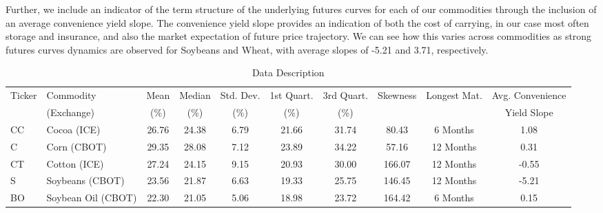\documentclass[12pt,a4paper]{article}
\providecommand{\tabularnewline}{\\}
\begin{document}
Further, we include an indicator of the term structure of the underlying futures curves for each of our commodities through the inclusion of an average convenience yield slope. The convenience yield slope provides an indication of both the cost of carrying, in our case most often storage and insurance, and also the market expectation of future price trajectory. We can see how this varies across commodities as strong futures curves dynamics are observed for Soybeans and Wheat, with average slopes of -5.21 and 3.71, respectively.

\begin{table}[!htbp]
\caption{Data Description}\label{tab:Data-Description}
\centering
\tabcolsep 0.025in
\begin{tabular}{@{}llcccccccc@{}}
\toprule
{\footnotesize{}Ticker} & {\footnotesize{}Commodity} & {\footnotesize{}Mean} & {\footnotesize{}Median} & {\footnotesize{}Std. Dev.} & {\footnotesize{}1st Quart.} & {\footnotesize{}3rd Quart.} & {\footnotesize{}Skewness} &  {\footnotesize{}Longest Mat.} & {\footnotesize{}Avg. Convenience}\tabularnewline
& {\footnotesize{}(Exchange)} &(\%)&(\%)&(\%)&(\%)&(\%)& & & {\footnotesize{}Yield Slope} \\
\midrule 
{\footnotesize{}CC} & {\footnotesize{}Cocoa (ICE)} & {\footnotesize{}26.76} & {\footnotesize{}24.38} & {\footnotesize{}6.79} & {\footnotesize{}21.66} & {\footnotesize{}31.74} & {\footnotesize{}80.43} & {\footnotesize{}6 Months} & {\footnotesize{}1.08}\tabularnewline
{\footnotesize{}C} & {\footnotesize{}Corn (CBOT)} & {\footnotesize{}29.35} & {\footnotesize{}28.08} & {\footnotesize{}7.12} & {\footnotesize{}23.89} & {\footnotesize{}34.22} & {\footnotesize{}57.16} & {\footnotesize{}12 Months} & {\footnotesize{}0.31}\tabularnewline
{\footnotesize{}CT} & {\footnotesize{}Cotton (ICE)} & {\footnotesize{}27.24} & {\footnotesize{}24.15} & {\footnotesize{}9.15} & {\footnotesize{}20.93} & {\footnotesize{}30.00} & {\footnotesize{}166.07} & {\footnotesize{}12 Months} & {\footnotesize{}-0.55}\tabularnewline
{\footnotesize{}S} & {\footnotesize{}Soybeans (CBOT)} & {\footnotesize{}23.56} & {\footnotesize{}21.87} & {\footnotesize{}6.63} & {\footnotesize{}19.33} & {\footnotesize{}25.75} & {\footnotesize{}146.45} & {\footnotesize{}12 Months} & {\footnotesize{}-5.21}\tabularnewline
{\footnotesize{}BO} & {\footnotesize{}Soybean Oil (CBOT)} & {\footnotesize{}22.30} & {\footnotesize{}21.05} & {\footnotesize{}5.06} & {\footnotesize{}18.98} & {\footnotesize{}23.72} & {\footnotesize{}164.42}  & {\footnotesize{}6 Months} & {\footnotesize{}0.15}\tabularnewline

\end{tabular}
\end{table}
\end{document}

